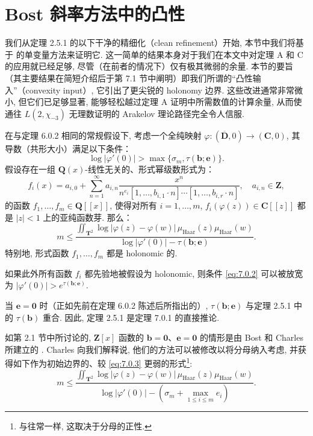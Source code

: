 \section{Bost 斜率方法中的凸性}\label{sec:7}

我们从定理 2.5.1 的以下干净的精细化（clean refinement）开始, 本节中我们将基于 \cite[第 5 节]{BC22} 的单变量方法来证明它. 这一简单的结果本身对于我们在本文中对定理 A 和 C 的应用就已经足够, 尽管（在前者的情况下）仅有极其微弱的余量. 本节的要旨（其主要结果在简短介绍后于第 7.1 节中阐明）即我们所谓的“凸性输入”（convexity input）, 它引出了更尖锐的 holonomy 边界. 这些改进通常非常微小, 但它们已足够显著, 能够轻松越过定理 A 证明中所需数值的计算余量, 从而使通往 \(L(2, \chi_{-3})\) 无理数证明的 Arakelov 理论路径完全令人信服.

\begin{theorem}\label{thm:7.0.1}
在与定理 6.0.2 相同的常规假设下, 考虑一个全纯映射 \(\varphi: (\overline{\mathbf{D}}, 0) \to (\mathbf{C}, 0)\), 其导数（共形大小）满足以下条件：
\begin{equation}\label{eq:7.0.2}
\log|\varphi'(0)| > \max\{\sigma_m, \tau(\mathbf{b}; \mathbf{e})\}.
\end{equation}
假设存在一组 \(\mathbf{Q}(x)\)-线性无关的、形式幂级数形式为：
\begin{equation*}
f_i(x) = a_{i,0} + \sum_{n=1}^{\infty} a_{i,n} \frac{x^n}{n^{e_i}[1,\dots,b_{i,1} \cdot n] \cdots [1,\dots,b_{i,r} \cdot n]}, \quad a_{i,n} \in \mathbf{Z},
\end{equation*}
的函数 \(f_1, \ldots, f_m \in \mathbf{Q}[\![x]\!]\), 
使得对所有 \(i = 1, \ldots, m\), \(f_i(\varphi(z)) \in \mathbf{C}[\![z]\!]\) 都是 \(|z| < 1\) 上的亚纯函数芽. 那么：
\begin{equation}\label{eq:7.0.3}
m \le \frac{\iint_{\mathbf{T}^2} \log |\varphi(z) - \varphi(w)| \,\mu_{\text{Haar}}(z)\mu_{\text{Haar}}(w)}{\log |\varphi'(0)| - \tau(\mathbf{b}; \mathbf{e})}.
\end{equation}
特别地, 形式函数 \(f_1, \ldots, f_m\) 都是 holonomic 的.

如果此外所有函数 \(f_i\) 都先验地被假设为 holonomic, 则条件 \eqref{eq:7.0.2} 可以被放宽为 \(|\varphi'(0)| > e^{\tau(\mathbf{b}; \mathbf{e})}\).
\end{theorem}

当 \(\mathbf{e} = \mathbf{0}\) 时（正如先前在定理 6.0.2 陈述后所指出的）, \(\tau(\mathbf{b}; \mathbf{e})\) 与定理 2.5.1 中的 \(\tau(\mathbf{b})\) 重合. 因此, 定理 2.5.1 是定理 7.0.1 的直接推论.

如第 2.1 节中所讨论的, \(\mathbf{Z}[x]\) 函数的 \(\mathbf{b} = \mathbf{0}\)、\(\mathbf{e} = \mathbf{0}\) 的情形是由 Bost 和 Charles 所建立的 \cite[推论 8.3.5]{BC22}. Charles 向我们解释说, 他们的方法可以被修改以将分母纳入考虑, 并获得如下作为初始边界的、较 \eqref{eq:7.0.3} 更弱的形式\footnote{与往常一样, 这取决于分母的正性.}:
\begin{equation}\label{eq:7.0.4}
m \le \frac{\iint_{\mathbf{T}^2} \log |\varphi(z) - \varphi(w)| \, \mu_{\text{Haar}}(z) \mu_{\text{Haar}}(w)}{\log |\varphi'(0)| - (\sigma_m + \max_{1 \le i \le m} e_i)}.
\end{equation}

